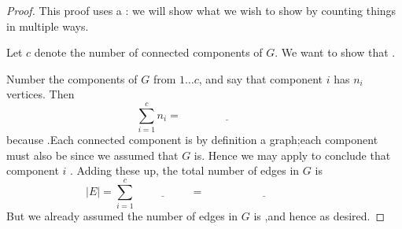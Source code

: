 \documentclass{tufte-handout}
\begin{document}
\begin{proof}
  This proof uses a : we will show what we
  wish to show by counting things in multiple ways.

  Let $c$ denote the number of connected components of $G$.  We want
  to show that \blank.

  Number the components of $G$ from $1 \dots c$, and say that
  component $i$ has $n_i$ vertices.  Then \[ \sum_{i=1}^c n_i =
    \underline{\phantom{XXXXXXXXXX}} \] because \blank.\linebreak  Each
  connected component is by definition a \blank graph;\linebreak each
  component must also be \blank\linebreak since we assumed that $G$ is.  Hence
  we may apply  to conclude that component $i$
  \blank.\linebreak
  Adding these up, the total number of edges in $G$ is
  \[ |E| = \sum_{i=1}^c \underline{\phantom{XXXXXX}} =
    \underline{\phantom{XXXXXXXXXXXXX}} \] But we already assumed the
  number of edges in $G$ is \blank,\linebreak and hence \blank as desired.
\end{proof}
\end{document}
